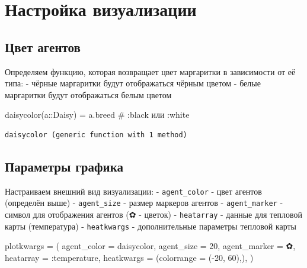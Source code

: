 \documentclass[
  12pt,
  a4paper,
  DIV=11,
  numbers=noendperiod]{scrreprt}
\newenvironment{Shaded}{\begin{snugshade}}{\end{snugshade}}
\newcommand{\CharTok}[1]{\textcolor[rgb]{0.13,0.47,0.30}{#1}}
\newcommand{\CommentTok}[1]{\textcolor[rgb]{0.37,0.37,0.37}{#1}}
\newcommand{\DataTypeTok}[1]{\textcolor[rgb]{0.68,0.00,0.00}{#1}}
\newcommand{\FloatTok}[1]{\textcolor[rgb]{0.68,0.00,0.00}{#1}}
\newcommand{\FunctionTok}[1]{\textcolor[rgb]{0.28,0.35,0.67}{#1}}
\newcommand{\NormalTok}[1]{\textcolor[rgb]{0.00,0.23,0.31}{#1}}
\newcommand{\OperatorTok}[1]{\textcolor[rgb]{0.37,0.37,0.37}{#1}}
\begin{document}
\section{Настройка
визуализации}\label{ux43dux430ux441ux442ux440ux43eux439ux43aux430-ux432ux438ux437ux443ux430ux43bux438ux437ux430ux446ux438ux438}

\subsection{Цвет
агентов}\label{ux446ux432ux435ux442-ux430ux433ux435ux43dux442ux43eux432}

Определяем функцию, которая возвращает цвет маргаритки в зависимости от
её типа: - чёрные маргаритки будут отображаться чёрным цветом - белые
маргаритки будут отображаться белым цветом

\begin{Shaded}
\begin{Highlighting}[]
\FunctionTok{daisycolor}\NormalTok{(a}\OperatorTok{::}\DataTypeTok{Daisy}\NormalTok{) }\OperatorTok{=}\NormalTok{ a.breed  }\CommentTok{\# :black или :white}
\end{Highlighting}
\end{Shaded}

\begin{verbatim}
daisycolor (generic function with 1 method)
\end{verbatim}

\subsection{Параметры
графика}\label{ux43fux430ux440ux430ux43cux435ux442ux440ux44b-ux433ux440ux430ux444ux438ux43aux430}

Настраиваем внешний вид визуализации: - \texttt{agent\_color} - цвет
агентов (определён выше) - \texttt{agent\_size} - размер маркеров
агентов - \texttt{agent\_marker} - символ для отображения агентов (✿ -
цветок) - \texttt{heatarray} - данные для тепловой карты (температура) -
\texttt{heatkwargs} - дополнительные параметры тепловой карты

\begin{Shaded}
\begin{Highlighting}[]
\NormalTok{plotkwargs }\OperatorTok{=}\NormalTok{ (}
\NormalTok{    agent\_color }\OperatorTok{=}\NormalTok{ daisycolor,}
\NormalTok{    agent\_size }\OperatorTok{=} \FloatTok{20}\NormalTok{,}
\NormalTok{    agent\_marker }\OperatorTok{=} \CharTok{\textquotesingle{}✿\textquotesingle{}}\NormalTok{,}
\NormalTok{    heatarray }\OperatorTok{=} \OperatorTok{:}\NormalTok{temperature,}
\NormalTok{    heatkwargs }\OperatorTok{=}\NormalTok{ (colorrange }\OperatorTok{=}\NormalTok{ (}\OperatorTok{{-}}\FloatTok{20}\NormalTok{, }\FloatTok{60}\NormalTok{),),}
\NormalTok{)}
\end{Highlighting}
\end{Shaded}
\end{document}
